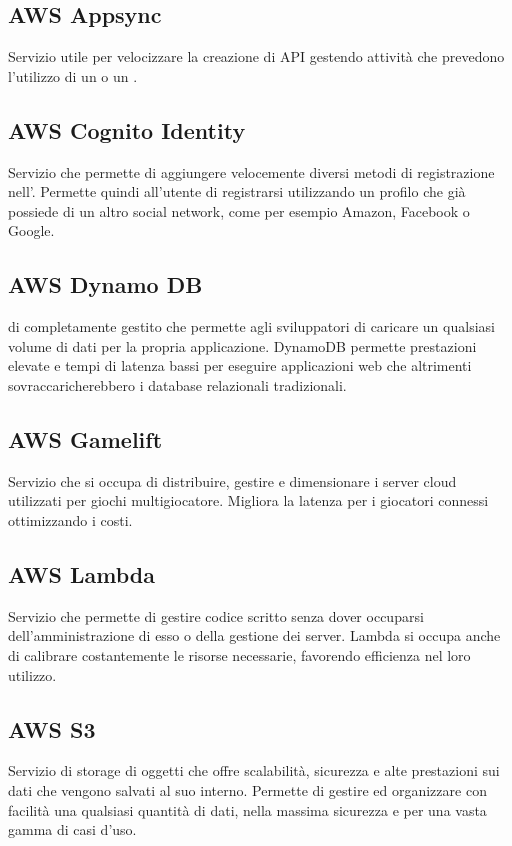 \subsection*{AWS Appsync}
Servizio  utile per velocizzare la creazione di API gestendo attività che prevedono l'utilizzo di un  o un .

\subsection*{AWS Cognito Identity}
Servizio  che permette di aggiungere velocemente diversi metodi di registrazione nell'. Permette quindi all'utente di registrarsi utilizzando un profilo che già possiede di un altro social network, come per esempio Amazon, Facebook o Google. 

\subsection*{AWS Dynamo DB}
  di  completamente gestito che permette agli sviluppatori di caricare un qualsiasi volume di dati per la propria applicazione. DynamoDB permette prestazioni elevate e tempi di latenza bassi per eseguire applicazioni web che altrimenti sovraccaricherebbero i database relazionali tradizionali.

\subsection*{AWS Gamelift}
Servizio  che si occupa di distribuire, gestire e dimensionare i server cloud utilizzati per giochi multigiocatore. Migliora la latenza per i giocatori connessi ottimizzando i costi.

\subsection*{AWS Lambda}
Servizio  che permette di gestire codice scritto senza dover occuparsi dell'amministrazione di esso o della gestione dei server. Lambda si occupa anche di calibrare costantemente le risorse necessarie, favorendo efficienza nel loro utilizzo. 

\subsection*{AWS S3}
Servizio  di storage di oggetti che offre scalabilità, sicurezza e alte prestazioni sui dati che vengono salvati al suo interno. Permette di gestire ed organizzare con facilità una qualsiasi quantità di dati, nella massima sicurezza e per una vasta gamma di casi d'uso.
